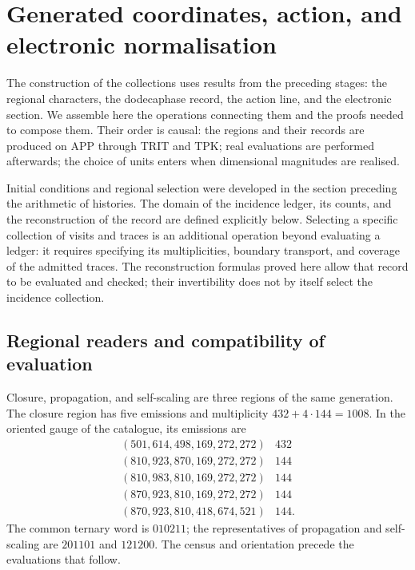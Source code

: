 \section{Generated coordinates, action, and electronic normalisation}
\label{vi:dep:seccion}

The construction of the collections uses results from the preceding stages:
the regional characters, the dodecaphase record, the action line, and the
electronic section. We assemble here the operations connecting them and the
proofs needed to compose them. Their order is causal: the regions and their
records are produced on APP through TRIT and TPK; real evaluations
are performed afterwards; the choice of units enters when dimensional
magnitudes are realised.

Initial conditions and regional selection were developed in
the section preceding the arithmetic of histories. The domain of the incidence
ledger, its counts, and the reconstruction of the record are defined
explicitly below. Selecting a specific collection of
visits and traces is an additional operation beyond evaluating a ledger:
it requires specifying its multiplicities, boundary transport, and
coverage of the admitted traces. The reconstruction formulas
proved here allow that record to be evaluated and checked; their
invertibility does not by itself select the incidence collection.

\subsection{Regional readers and compatibility of evaluation}
\label{vi:dep:regiones}

Closure, propagation, and self-scaling are three regions of the same
generation. The closure region has five emissions and multiplicity
\(432+4\cdot144=1008\). In the oriented gauge of the catalogue, its emissions
are
\[
\begin{array}{c|r}
(501,614,498,169,272,272)&432\\
(810,923,870,169,272,272)&144\\
(810,983,810,169,272,272)&144\\
(870,923,810,169,272,272)&144\\
(870,923,810,418,674,521)&144.
\end{array}
\]
The common ternary word is \(010211\); the representatives of propagation
and self-scaling are \(201101\) and \(121200\). The census and orientation
precede the evaluations that follow.

